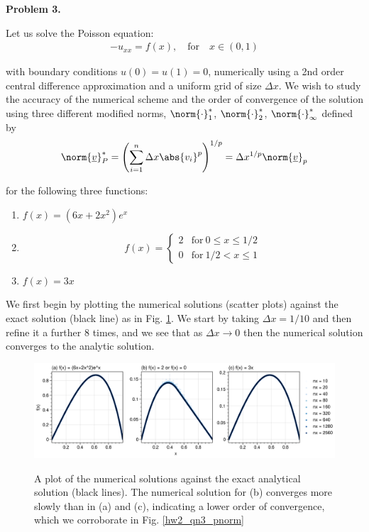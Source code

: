 \textbf{Problem 3.}

Let us solve the Poisson equation:
\begin{align*}
    -u_{xx} = f(x), \quad \text{for} \quad x\in(0,1)
\end{align*}

with boundary conditions $u(0)=u(1)=0$, numerically using a 2nd order central difference approximation and a uniform grid of size $\Delta x$.  We wish to study the accuracy of the numerical scheme and the order of convergence of the solution using three different modified norms, $\norm{\cdot}_1^*$, $\norm{\cdot}_2^*$, $\norm{\cdot}_\infty^*$ defined by
\begin{align*}
    \norm{\underline{v}}_P^* = \left( \sum_{i=1}^n \Delta x \abs{v_i}^p \right)^{1/p}
    = \Delta x^{1/p} \norm{\underline{v}}_p
\end{align*}

for the following three functions:

\begin{enumerate}[label=(\alph*),itemsep=0mm]
    
    \item $f(x) = (6x + 2x^2)e^x$
    \item $$f(x) = \begin{cases}
        2 & \text{for} \> 0 \leq x \leq 1/2 \\
        0 & \text{for} \> 1/2 < x \leq 1
    \end{cases}$$
    \item $f(x) = 3x$
    
\end{enumerate}

We first begin by plotting the numerical solutions (scatter plots) against the exact solution (black line) as in Fig. \ref{hw2_qn3_num}.  We start by taking $\Delta x = 1/10$ and then refine it a further 8 times, and we see that as $\Delta x \rightarrow 0$ then the numerical solution converges to the analytic solution.

\begin{figure}[h!]
\centering
\includegraphics[width=\textwidth]{figures/hw2_qn3_numericalsol.png}\\
\caption{A plot of the numerical solutions against the exact analytical solution (black lines).  The numerical solution for (b) converges more slowly than in (a) and (c), indicating a lower order of convergence, which we corroborate in Fig. \ref{hw2_qn3_pnorm}}
\label{hw2_qn3_num}
\end{figure}

